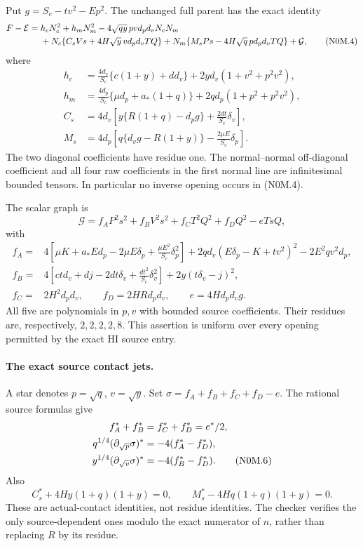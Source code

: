 Put $g=S_c-tv^2-Ep^2$. The unchanged full parent has the exact identity
\begin{align}
 F-\mathcal E={}&h_cN_c^2+h_mN_m^2
 -4\sqrt{qy}\,pv d_pd_vN_cN_m\notag\\
 &+N_c\{C_sVs+4H\sqrt y\,v d_pd_vTQ\}
 +N_m\{M_sPs-4H\sqrt q\,p d_pd_vTQ\}
 +\mathcal G,                                           \tag{N0M.4}
\end{align}
where
\begin{align*}
 h_c&=\frac{4d_v}{S_c}\{c(1+y)+dd_v\}
       +2yd_v(1+v^2+p^2v^2),\\
 h_m&=\frac{4d_p}{S_c}\{\mu d_p+a_*(1+q)\}
       +2qd_p(1+p^2+p^2v^2),\\
 C_s&=4d_v\left[y\{R(1+q)-d_pg\}
                    +\frac{2dt}{S_c}\delta_v\right],\\
 M_s&=4d_p\left[q\{d_vg-R(1+y)\}
                    -\frac{2\mu E}{S_c}\delta_p\right].
\end{align*}
The two diagonal coefficients have residue one. The normal--normal
off-diagonal coefficient and all four raw coefficients in the first
normal line are infinitesimal bounded tensors. In particular no inverse
opening occurs in (N0M.4).

The scalar graph is
\[
 \mathcal G=f_AP^2s^2+f_BV^2s^2
       +f_CT^2Q^2+f_DQ^2-eTsQ,                         \tag{N0M.5}
\]
with
\begin{align*}
 f_A={}&4\left[\mu K+a_*Ed_p-2\mu E\delta_p
                    +\frac{\mu E^2}{S_c}\delta_p^2\right]
 +2qd_v(E\delta_p-K+tv^2)^2-2E^2qv^2d_p,\\
 f_B={}&4\left[ctd_v+dj-2dt\delta_v
                    +\frac{dt^2}{S_c}\delta_v^2\right]
 +2y(t\delta_v-j)^2,\\
 f_C={}&2H^2d_pd_v,\qquad f_D=2HRd_pd_v,
 \qquad e=4Hd_pd_vg.
\end{align*}
All five are polynomials in $p,v$ with bounded source coefficients.
Their residues are, respectively, $2,2,2,2,8$. This assertion is uniform
over every opening permitted by the exact HI source entry.

\paragraph{The exact source contact jets.}
A star denotes $p=\sqrt q$, $v=\sqrt y$. Set
$\sigma=f_A+f_B+f_C+f_D-e$. The rational source formulas give
\begin{align}
 f_A^*+f_B^*&=f_C^*+f_D^*=e^*/2,\notag\\
 q^{1/4}(\partial_{\sqrt p}\sigma)^*
   &=-4(f_A^*-f_D^*),\notag\\
 y^{1/4}(\partial_{\sqrt v}\sigma)^*
   &=-4(f_B^*-f_D^*).                              \tag{N0M.6}
\end{align}
Also
\[
 C_s^*+4Hy(1+q)(1+y)=0,\qquad
 M_s^*-4Hq(1+q)(1+y)=0.                           \tag{N0M.7}
\]
These are actual-contact identities, not residue identities. The checker
verifies the only source-dependent ones modulo the exact numerator of
$n$, rather than replacing $R$ by its residue.

